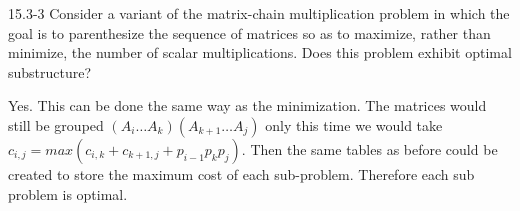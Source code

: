 \begin{problem}{15.3-3}
  Consider a variant of the matrix-chain multiplication problem in which the goal is to parenthesize the sequence of
  matrices so as to maximize, rather than minimize, the number of scalar multiplications. Does this problem exhibit
  optimal substructure?
  \begin{solution}
    Yes. This can be done the same way as the minimization. The matrices would still be grouped $(A_i \ldots A_k)(A_{k +
    1} \ldots A_j)$ only this time we would take $c_{i,j} = max(c_{i,k} + c_{k+1,j} + p_{i - 1}p_kp_j)$. Then the same
    tables as before could be created to store the maximum cost of each sub-problem. Therefore each sub problem is
    optimal.
  \end{solution}
\end{problem}


